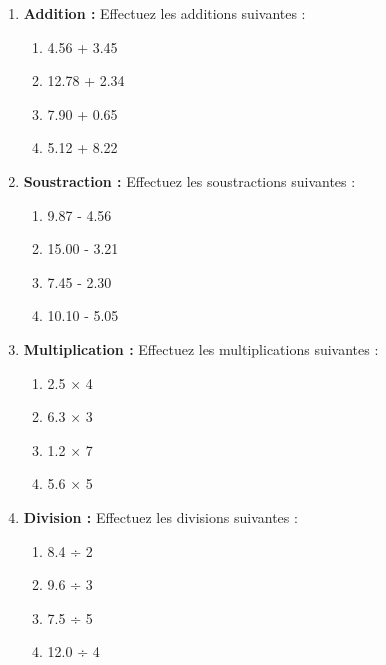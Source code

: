 \documentclass{article}
\begin{document}
\begin{tcolorbox}[colback=yellow!10!white, colframe=yellow!75!black, sharp corners=south, boxrule=0.8mm, title=Exercices]
\begin{enumerate}[label=\textbf{\arabic*.}]
        \item \textbf{Addition :} Effectuez les additions suivantes :
            \begin{enumerate}
                \item 4.56 + 3.45
                \item 12.78 + 2.34
                \item 7.90 + 0.65
                \item 5.12 + 8.22
            \end{enumerate}

        \item \textbf{Soustraction :} Effectuez les soustractions suivantes :
            \begin{enumerate}
                \item 9.87 - 4.56
                \item 15.00 - 3.21
                \item 7.45 - 2.30
                \item 10.10 - 5.05
            \end{enumerate}

        \item \textbf{Multiplication :} Effectuez les multiplications suivantes :
            \begin{enumerate}
                \item 2.5 × 4
                \item 6.3 × 3
                \item 1.2 × 7
                \item 5.6 × 5
            \end{enumerate}

        \item \textbf{Division :} Effectuez les divisions suivantes :
            \begin{enumerate}
                \item 8.4 ÷ 2
                \item 9.6 ÷ 3
                \item 7.5 ÷ 5
                \item 12.0 ÷ 4
            \end{enumerate}
    \end{enumerate}
\end{tcolorbox}
\end{document}
